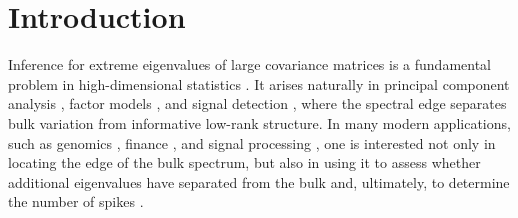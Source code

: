 \documentclass[12pt]{article}
\theoremstyle{plain}
\numberwithin{equation}{section}
\begin{document}






\section{Introduction}

Inference for extreme eigenvalues of large covariance matrices is a fundamental problem in high-dimensional statistics \citep{Johnstone2007,YaoZhengBai2015}. It arises naturally in principal component analysis \citep{anderson2003introduction}, factor models \citep{bai2002determining,onatski2009formal,Dobriban2020}, and signal detection \citep{9779233,Nadler2008}, where the spectral edge separates bulk variation from informative low-rank structure. In many modern applications, such as genomics \citep{patterson2006population,Price2006,lappalainen2013transcriptome,1000Genomes2015}, finance \citep{Markowitz1952,LedoitWolf2003,FanLiaoMincheva2013}, and signal processing \citep{nadakuditi2014optshrink,CouilletHachem2011}, one is interested not only in locating the edge of the bulk spectrum, but also in using it to assess whether additional eigenvalues have separated from the bulk and, ultimately, to determine the number of spikes \citep{Johnstone2001}.
\end{document}
